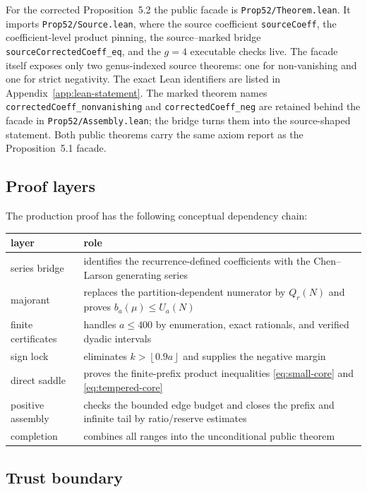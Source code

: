 \documentclass[11pt]{article}
\theoremstyle{definition}
\theoremstyle{remark}
\newcommand{\floor}[1]{\left\lfloor #1\right\rfloor}
\newcommand{\code}[1]{\texttt{#1}}
\begin{document}
For the corrected Proposition~5.2 the public facade is
\code{Prop52/Theorem.lean}.  It imports \code{Prop52/Source.lean}, where the
source coefficient \code{sourceCoeff}, the coefficient-level product pinning,
the source--marked bridge \code{sourceCorrectedCoeff\_eq}, and the $g=4$
executable checks live.
The facade itself exposes only two genus-indexed source theorems: one for
non-vanishing and one for strict negativity.  The exact Lean identifiers are
listed in Appendix~\ref{app:lean-statement}.  The marked theorem names
\code{correctedCoeff\_nonvanishing} and \code{correctedCoeff\_neg} are retained
behind the facade in \code{Prop52/Assembly.lean}; the bridge turns them into the
source-shaped statement.  Both public theorems carry the same axiom report as
the Proposition~5.1 facade.

\subsection{Proof layers}

The production proof has the following conceptual dependency chain:
\begin{center}
\begin{tabular}{p{}p{}}
\toprule
layer & role\\
\midrule
series bridge & identifies the recurrence-defined coefficients with the
  Chen--Larson generating series\\
majorant & replaces the partition-dependent numerator by $Q_r(N)$ and proves
  $b_a(\mu)\le U_a(N)$\\
finite certificates & handles $a\le400$ by enumeration, exact rationals, and
  verified dyadic intervals\\
sign lock & eliminates $k>\floor{0.9a}$ and supplies the negative margin\\
direct saddle & proves the finite-prefix product inequalities
  \eqref{eq:small-core} and \eqref{eq:tempered-core}\\
positive assembly & checks the bounded edge budget and closes the prefix and
  infinite tail by ratio/reserve estimates\\
completion & combines all ranges into the unconditional public theorem\\
\bottomrule
\end{tabular}
\end{center}

\subsection{Trust boundary}
\end{document}

